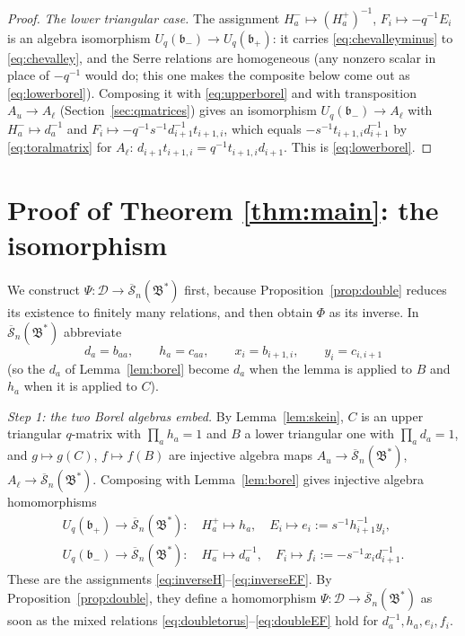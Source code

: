\documentclass[11pt]{article}
\theoremstyle{remark}
\newcommand{\U}{U_q}
\newcommand{\bp}{\mathfrak b_+}
\newcommand{\bm}{\mathfrak b_-}
\newcommand{\redS}{\overline{\mathcal S}_n}
\newcommand{\Bstar}{\mathfrak B^*}
\newcommand{\cD}{\mathcal D}
\begin{document}
\begin{proof}
\emph{The lower triangular case.} The assignment
$H^-_a\mapsto(H^+_a)^{-1}$, $F_i\mapsto-q^{-1}E_i$
is an algebra isomorphism $\U(\bm)\to\U(\bp)$: it carries
\eqref{eq:chevalleyminus} to \eqref{eq:chevalley}, and the Serre
relations are homogeneous (any nonzero scalar in place of $-q^{-1}$
would do; this one makes the composite below come out as
\eqref{eq:lowerborel}). Composing it with \eqref{eq:upperborel} and
with transposition $A_u\to A_\ell$ (Section~\ref{sec:qmatrices}) gives
an isomorphism $\U(\bm)\to A_\ell$ with $H^-_a\mapsto d_a^{-1}$ and
$F_i\mapsto-q^{-1}s^{-1}d_{i+1}^{-1}t_{i+1,i}$, which equals
$-s^{-1}t_{i+1,i}d_{i+1}^{-1}$ by \eqref{eq:toralmatrix} for $A_\ell$:
$d_{i+1}t_{i+1,i}=q^{-1}t_{i+1,i}d_{i+1}$. This is
\eqref{eq:lowerborel}.
\end{proof}

\section{Proof of Theorem \ref{thm:main}: the isomorphism}\label{sec:proof}

We construct $\Psi:\cD\to\redS(\Bstar)$ first, because
Proposition~\ref{prop:double} reduces its existence to finitely many
relations, and then obtain $\Phi$ as its inverse. In $\redS(\Bstar)$
abbreviate
\[
 d_a=b_{aa},\qquad h_a=c_{aa},\qquad
 x_i=b_{i+1,i},\qquad y_i=c_{i,i+1}
\]
(so the $d_a$ of Lemma~\ref{lem:borel} become $d_a$ when the lemma is
applied to $B$ and $h_a$ when it is applied to $C$).

\emph{Step 1: the two Borel algebras embed.} By Lemma~\ref{lem:skein},
$C$ is an upper triangular $q$-matrix with $\prod_ah_a=1$ and $B$ a
lower triangular one with $\prod_ad_a=1$, and $g\mapsto g(C)$,
$f\mapsto f(B)$ are injective algebra maps $A_u\to\redS(\Bstar)$,
$A_\ell\to\redS(\Bstar)$. Composing with Lemma~\ref{lem:borel} gives
injective algebra homomorphisms
\begin{gather*}
 \U(\bp)\to\redS(\Bstar):\quad H^+_a\mapsto h_a,\quad
 E_i\mapsto e_i:=s^{-1}h_{i+1}^{-1}y_i,\\
 \U(\bm)\to\redS(\Bstar):\quad H^-_a\mapsto d_a^{-1},\quad
 F_i\mapsto f_i:=-s^{-1}x_id_{i+1}^{-1}.
\end{gather*}
These are the assignments \eqref{eq:inverseH}--\eqref{eq:inverseEF}.
By Proposition~\ref{prop:double}, they define a homomorphism
$\Psi:\cD\to\redS(\Bstar)$ as soon as the mixed relations
\eqref{eq:doubletorus}--\eqref{eq:doubleEF} hold for
$d_a^{-1},h_a,e_i,f_i$.
\end{document}
